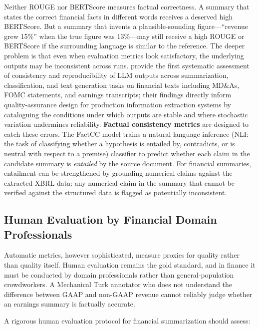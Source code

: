Neither ROUGE nor BERTScore measures factual correctness. A summary that states the
correct financial facts in different words receives a deserved high BERTScore. But a
summary that invents a plausible-sounding figure---``revenue grew 15\%'' when the true
figure was 13\%---may still receive a high ROUGE or BERTScore if the surrounding language
is similar to the reference. The deeper problem is that even when evaluation metrics look
satisfactory, the underlying outputs may be inconsistent across runs. \citet{WangWang2025} provide the first systematic assessment of consistency and
reproducibility of LLM outputs across summarization, classification, and text generation
tasks on financial texts including MD\&As, FOMC statements, and earnings transcripts;
their findings directly inform quality-assurance design for production information
extraction systems by cataloguing the conditions under which outputs are stable and where
stochastic variation undermines reliability. \textbf{Factual consistency metrics} are designed to catch
these errors. The FactCC model \citep{kryscinski2020evaluating} trains a natural language
inference (NLI: the task of classifying whether a hypothesis is entailed by, contradicts, or is neutral with respect to a premise) classifier to predict whether each claim in the candidate summary is
\emph{entailed} by the source document. For financial summaries, entailment can be
strengthened by grounding numerical claims against the extracted XBRL data: any
numerical claim in the summary that cannot be verified against the structured data is
flagged as potentially inconsistent.

\subsection{Human Evaluation by Financial Domain Professionals}
\label{sec:ch14-human-evaluation}

Automatic metrics, however sophisticated, measure proxies for quality rather than quality
itself. Human evaluation remains the gold standard, and in finance it must be conducted
by domain professionals rather than general-population crowdworkers. A Mechanical Turk
annotator who does not understand the difference between GAAP and non-GAAP revenue cannot
reliably judge whether an earnings summary is factually accurate.

A rigorous human evaluation protocol for financial summarization should assess:

